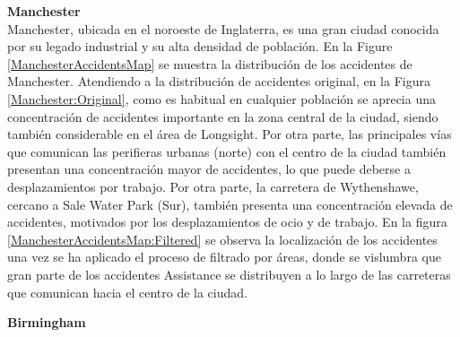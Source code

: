 \documentclass{uathesis-es}
\begin{document}
{	
	\textbf{Manchester}\\
	
	Manchester, ubicada en el noroeste de Inglaterra, es una gran ciudad conocida por su legado industrial y su alta densidad de población. En la Figure \ref{ManchesterAccidentsMap} se muestra la distribución de los accidentes de Manchester. Atendiendo a la distribución de accidentes original, en la Figura \ref{Manchester:Original}, como es habitual en cualquier población se aprecia una concentración de accidentes importante en la zona central de la ciudad, siendo también considerable en el área de Longsight. Por otra parte, las principales vías que comunican las perifieras urbanas (norte) con el centro de la ciudad también presentan una concentración mayor de accidentes, lo que puede deberse a desplazamientos por trabajo. Por otra parte, la carretera de Wythenshawe, cercano a Sale Water Park (Sur), también presenta una concentración elevada de accidentes, motivados por los desplazamientos de ocio y de trabajo. En la figura \ref{ManchesterAccidentsMap:Filtered} se observa la localización de los accidentes una vez se ha aplicado el proceso de filtrado por áreas, donde se vislumbra que gran parte de los accidentes Assistance se distribuyen a lo largo de las carreteras que comunican hacia el centro de la ciudad.
	
	
	
	\textbf{Birmingham}\\
	
}
\end{document}
